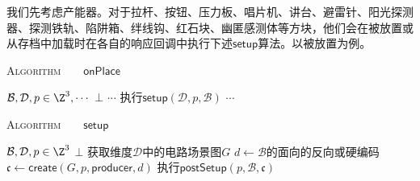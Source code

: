 \documentclass[a4,11pt]{aleph-notas}
\begin{document}
我们先考虑产能器。对于拉杆、按钮、压力板、唱片机、讲台、避雷针、阳光探测器、探测铁轨、陷阱箱、绊线钩、红石块、幽匿感测体等方块，他们会在被放置或从存档中加载时在各自的响应回调中执行下述$\mathsf{setup}$算法。以被放置为例。

\begin{codigo}
\textsc{Algorithm}\ \ \ \ $\mathsf{onPlace}$
\begin{algorithmic}[1]
    \Require $\mathcal{B},\mathcal{D},p\in\Z^3,\cdots$
    \Ensure $\bot$
    \State $\cdots$
    \State 执行$\mathsf{setup}(\mathcal{D},p,\mathcal{B})$
    \State $\cdots$
    \State \Return
\end{algorithmic}
\end{codigo}

\begin{codigo}
\textsc{Algorithm}\ \ \ \ $\mathsf{setup}$
\begin{algorithmic}[1]
    \Require $\mathcal{B},\mathcal{D},p\in\Z^3$
    \Ensure $\bot$
    \State 获取维度$\mathcal{D}$中的电路场景图$G$
    \State $d\gets\mathcal{B}$的面向的反向或硬编码
    \State $\mathfrak{c}\gets\mathsf{create}(G,p,\mathsf{producer},d)$
    \State 执行$\mathsf{postSetup}(p,\mathcal{B},\mathfrak{c})$
    \State \Return
\end{algorithmic}
\end{codigo}
\end{document}
